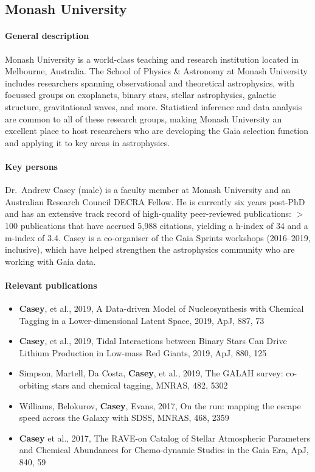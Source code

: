 \subsection{Monash University}
\label{sec:mona}

\paragraph{General description}
Monash University is a world-class teaching and research institution located in Melbourne, Australia. The School of Physics \& Astronomy at Monash University includes researchers spanning observational and theoretical astrophysics, with focussed groups on exoplanets, binary stars, stellar astrophysics, galactic structure, gravitational waves, and more. Statistical inference and data analysis are common to all of these research groups, making Monash University an excellent place to host researchers who are developing the Gaia selection function and applying it to key areas in astrophysics.

\paragraph{Key persons}
Dr.~Andrew Casey (male) is a faculty member at Monash University and an Australian Research Council DECRA Fellow. He is currently six years post-PhD and has an extensive track record of high-quality peer-reviewed publications: $>$100 publications that have accrued 5,988 citations, yielding a h-index of 34 and a m-index of 3.4. Casey is a co-organiser of the Gaia Sprints workshops (2016--2019, inclusive), which have helped strengthen the astrophysics community who are working with Gaia data.


\paragraph{Relevant publications}
\begin{itemize}
	\item \textbf{Casey}, et al., 2019, A Data-driven Model of Nucleosynthesis with Chemical Tagging in a Lower-dimensional Latent Space, 2019, ApJ, 887, 73
	\item \textbf{Casey}, et al., 2019, Tidal Interactions between Binary Stars Can Drive Lithium Production in Low-mass Red Giants, 2019, ApJ, 880, 125
	\item Simpson, Martell, Da Costa, \textbf{Casey}, et al., 2019, The GALAH survey: co-orbiting stars and chemical tagging, MNRAS, 482, 5302
	\item Williams, Belokurov, \textbf{Casey}, Evans, 2017, On the run: mapping the escape speed across the Galaxy with SDSS, MNRAS, 468, 2359
	\item \textbf{Casey} et al., 2017, The RAVE-on Catalog of Stellar Atmospheric Parameters and Chemical Abundances for Chemo-dynamic Studies in the Gaia Era, ApJ, 840, 59
\end{itemize}


